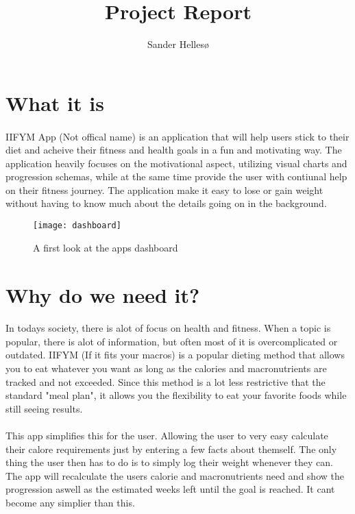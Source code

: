 \documentclass{article}
\title{Project Report}
\author{Sander Hellesø}
\begin{document}

\setcounter{page}{1}

\tableofcontents
\newpage

\section{What it is}
\paragraph{}
    IIFYM App (Not offical name) is an application that will help users stick to their diet and acheive their fitness and health
    goals in a fun and motivating way. The application heavily focuses on the motivational aspect, utilizing visual charts and progression schemas, while
    at the same time provide the user with contiunal help on their fitness journey. The application make it easy to lose or gain weight without having to know
    much about the details going on in the background.

    \hfill \break
    \hfill \break
    \hfill \break

    \begin{figure}[h!]
        \texttt{[image: dashboard]}
        \centering
        \caption{A first look at the apps dashboard}
    \end{figure}


\newpage

\section{Why do we need it?}
\paragraph{}
    In todays society, there is alot of focus on health and fitness. When a topic is popular, there is alot of information, but often most of it is overcomplicated or outdated.
    IIFYM (If it fits your macros) is a popular dieting method that allows you to eat whatever you want as long as the calories and macronutrients are tracked and not exceeded.
    Since this method is a lot less restrictive that the standard "meal plan", it allows you the flexibility to eat your favorite foods while still seeing results.

\paragraph{}
    This app simplifies this for the user. Allowing the user to very easy calculate their calore requirements just by entering a few facts about themself. The only thing the
    user then has to do is to simply log their weight whenever they can. The app will recalculate the users calorie and macronutrients need and show the progression aswell
    as the estimated weeks left until the goal is reached. It cant become any simplier than this.
\end{document}

